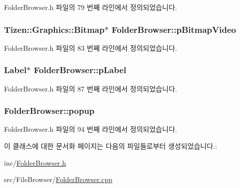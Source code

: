 Folder\+Browser.\+h 파일의 79 번째 라인에서 정의되었습니다.

\hypertarget{class_folder_browser_a90c038f6f300762824cdca08b339c974}{
\subsubsection[{p\+Bitmap\+Video}]{\setlength{\rightskip}{0pt plus 5cm}Tizen\+::\+Graphics\+::\+Bitmap$\ast$ Folder\+Browser\+::p\+Bitmap\+Video\hspace{0.3cm}{\ttfamily [private]}}}\label{class_folder_browser_a90c038f6f300762824cdca08b339c974}


Folder\+Browser.\+h 파일의 83 번째 라인에서 정의되었습니다.

\hypertarget{class_folder_browser_ac56283b5a6a8dc00438d7bf4625c82bd}{
\subsubsection[{p\+Label}]{\setlength{\rightskip}{0pt plus 5cm}Label$\ast$ Folder\+Browser\+::p\+Label\hspace{0.3cm}{\ttfamily [private]}}}\label{class_folder_browser_ac56283b5a6a8dc00438d7bf4625c82bd}


Folder\+Browser.\+h 파일의 87 번째 라인에서 정의되었습니다.

\hypertarget{class_folder_browser_a9715e8af0c63d75be7c1d65f3c4b47f8}{
\subsubsection[{popup}]{ Folder\+Browser\+::popup\hspace{0.3cm}{\ttfamily [private]}}}\label{class_folder_browser_a9715e8af0c63d75be7c1d65f3c4b47f8}


Folder\+Browser.\+h 파일의 94 번째 라인에서 정의되었습니다.



이 클래스에 대한 문서화 페이지는 다음의 파일들로부터 생성되었습니다.\+:\begin{DoxyCompactItemize}
\item 
inc/\hyperlink{_folder_browser_8h}{Folder\+Browser.\+h}\item 
src/\+File\+Browser/\hyperlink{_folder_browser_8cpp}{Folder\+Browser.\+cpp}\end{DoxyCompactItemize}
